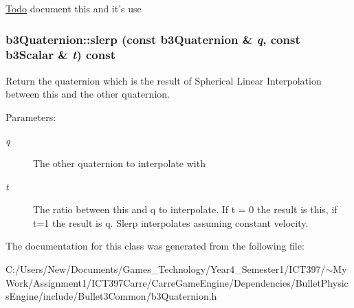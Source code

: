 \begin{Desc}
\item[\hyperlink{todo__todo000003}{Todo}]document this and it's use \end{Desc}
\hypertarget{classb3_quaternion_9b64bb67f4ece30723d963132478049c}{
\subsubsection[slerp]{ b3Quaternion::slerp (const {\bf b3Quaternion} \& {\em q}, \/  const b3Scalar \& {\em t}) const}}
\label{classb3_quaternion_9b64bb67f4ece30723d963132478049c}


Return the quaternion which is the result of Spherical Linear Interpolation between this and the other quaternion. 

\begin{Desc}
\item[Parameters:]
\begin{description}
\item[{\em q}]The other quaternion to interpolate with \item[{\em t}]The ratio between this and q to interpolate. If t = 0 the result is this, if t=1 the result is q. Slerp interpolates assuming constant velocity. \end{description}
\end{Desc}


The documentation for this class was generated from the following file:\begin{CompactItemize}
\item 
C:/Users/New/Documents/Games\_\-Technology/Year4\_\-Semester1/ICT397/$\sim$My Work/Assignment1/ICT397Carre/CarreGameEngine/Dependencies/BulletPhysicsEngine/include/Bullet3Common/b3Quaternion.h\end{CompactItemize}
